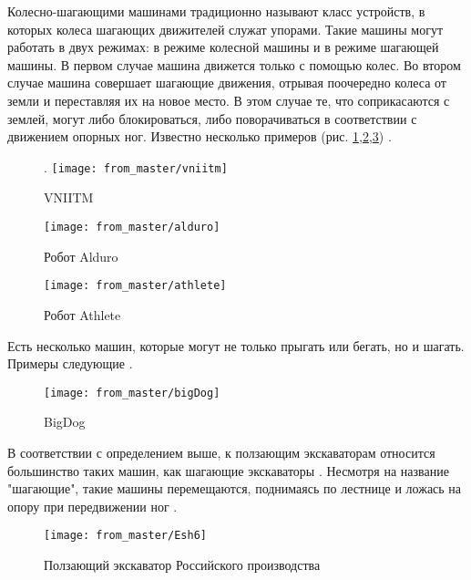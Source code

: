 Колесно-шагающими машинами традиционно называют класс устройств, в которых колеса шагающих движителей служат упорами. Такие машины могут работать в двух режимах: в режиме колесной машины и в режиме шагающей машины. В первом случае машина движется только с помощью колес. Во втором случае машина совершает шагающие движения, отрывая поочередно колеса от земли и переставляя их на новое место. В этом случае те, что соприкасаются с землей, могут либо блокироваться, либо поворачиваться в соответствии с движением опорных ног.
Известно несколько примеров (рис. \ref{fig:vniitm},\ref{fig:alduro},\ref{fig:athlete}) \cite{germann2001joystick}.

\begin{figure}[H].
\centering\texttt{[image: from\_master/vniitm]}
\caption{VNIITM}
\label{fig:vniitm}
\end{figure}

\begin{figure}[H]
\centering\texttt{[image: from\_master/alduro]}
\caption{Робот Alduro}
\label{fig:alduro}
\end{figure}

\begin{figure}[H]
\centering\texttt{[image: from\_master/athlete]}
\caption{Робот Athlete}
\label{fig:athlete}
\end{figure}

Есть несколько машин, которые могут не только прыгать или бегать, но и шагать. Примеры следующие \cite{Pavl2013,volkovaModelirovanieDvizheniyaMnogozvennogo2013,bidgoly2010learning,yacunVibrorobotDlyaVertikalnogo2010} .

\begin{figure}[H]
    \centering\texttt{[image: from\_master/bigDog]}
\caption{BigDog}
\label{fig:bigDog}
\end{figure}

В соответствии с определением выше, к ползающим экскаваторам относится большинство таких машин, как шагающие экскаваторы . Несмотря на название "шагающие", такие машины перемещаются, поднимаясь по лестнице и ложась на опору при передвижении ног \cite{peters2010prototype,gradeckiySostoyaniePerspektivyRazvitiya2014,bidgoly2010learning}.

\begin{figure}[H]
\centering\texttt{[image: from\_master/Esh6]}
\caption{Ползающий экскаватор Российского производства}
\label{fig:Esh6}
\end{figure}

